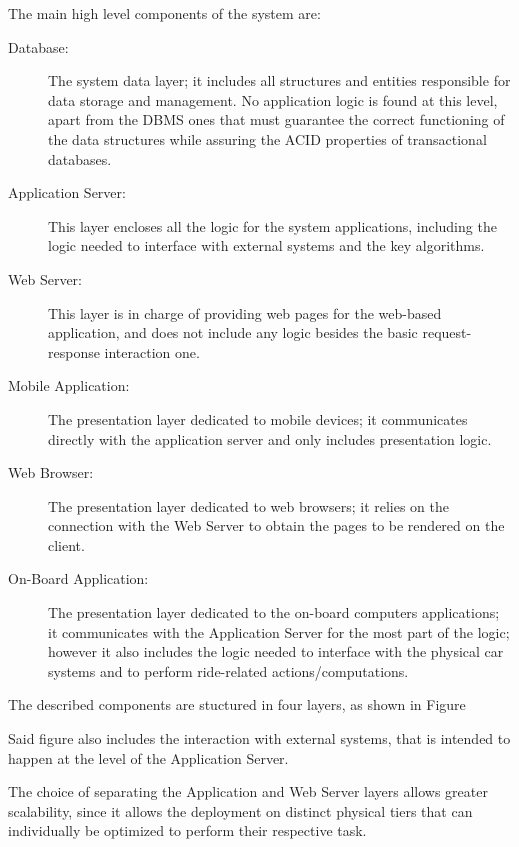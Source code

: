 The main high level components of the system are:

\begin{description}
\item[Database:] The system data layer; it includes all structures and entities responsible for data storage and management. No application logic is found at this level, apart from the DBMS ones that must guarantee the correct functioning of the data structures while assuring the ACID properties of transactional databases.
\item[Application Server:] This layer encloses all the logic for the system applications, including the logic needed to interface with external systems and the key algorithms.
\item[Web Server:] This layer is in charge of providing web pages for the web-based application, and does not include any logic besides the basic request-response interaction one.
\item[Mobile Application:] The presentation layer dedicated to mobile devices; it communicates directly with the application server and only includes presentation logic.
\item[Web Browser:] The presentation layer dedicated to web browsers; it relies on the connection with the Web Server to obtain the pages to be rendered on the client.
\item[On-Board Application:] The presentation layer dedicated to the on-board computers applications; it communicates with the Application Server for the most part of the logic; however it also includes the logic needed to interface with the physical car systems and to perform ride-related actions/computations.
\end{description}

The described components are stuctured in four layers, as shown in Figure %

Said figure also includes the interaction with external systems, that is intended to happen at the level of the Application Server.

The choice of separating the Application and Web Server layers allows greater scalability, since it allows the deployment on distinct physical tiers that can individually be optimized to perform their respective task.